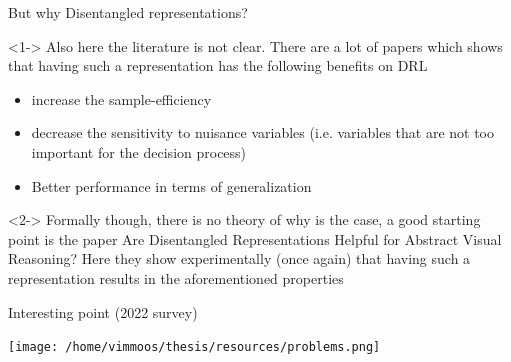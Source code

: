 \documentclass[presentation]{beamer}
\begin{document}
\begin{frame}[label={sec:org60a2e7a}]{But why Disentangled representations?}
\begin{block}<1->{}
Also here the literature is not clear. There are a lot of papers which
shows that having such a representation has the following benefits on DRL
\begin{itemize}
\item increase the sample-efficiency
\item decrease the sensitivity to nuisance variables
(i.e. variables that are not too important for the decision process)
\item Better performance in terms of generalization
\end{itemize}
\end{block}
\begin{block}<2->{}
Formally though, there is no theory of why is the case, a good starting point is the paper Are Disentangled Representations Helpful for
Abstract Visual Reasoning?
Here they show experimentally (once again) that having such a representation
results in the aforementioned properties
\end{block}
\end{frame}
\begin{frame}[label={sec:org44e4149}]{Interesting point (2022 survey)}
\begin{center}
\texttt{[image: /home/vimmoos/thesis/resources/problems.png]}
\end{center}
\end{frame}
\end{document}
